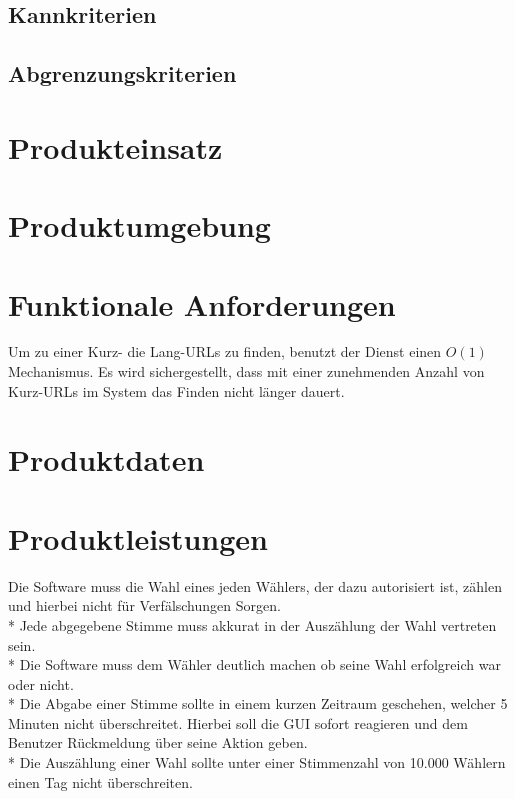 \documentclass[parskip=full,11pt,twoside]{scrartcl}
\begin{document}
\subsection{Kannkriterien}

\subsection{Abgrenzungskriterien}

\section{Produkteinsatz}

\section{Produktumgebung}

\section{Funktionale Anforderungen}

Um zu einer Kurz- die Lang-URLs zu finden,
benutzt der Dienst einen $O(1)$ Mechanismus.
Es wird sichergestellt,
dass mit einer zunehmenden Anzahl von Kurz-URLs im System
das Finden nicht länger dauert.

\section{Produktdaten}

\section{Produktleistungen}
Die Software muss die Wahl eines jeden Wählers, der dazu autorisiert ist, zählen und hierbei nicht für Verfälschungen Sorgen. \\*
Jede abgegebene Stimme muss akkurat in der Auszählung der Wahl vertreten sein. \\*
Die Software muss dem Wähler deutlich machen ob seine Wahl erfolgreich war oder nicht. \\*
Die Abgabe einer Stimme sollte in einem kurzen Zeitraum geschehen, welcher 5 Minuten nicht überschreitet.
Hierbei soll die GUI sofort reagieren und dem Benutzer Rückmeldung über seine Aktion geben. \\*
Die Auszählung einer Wahl sollte unter einer Stimmenzahl von 10.000 Wählern einen Tag nicht überschreiten. 
\end{document}
